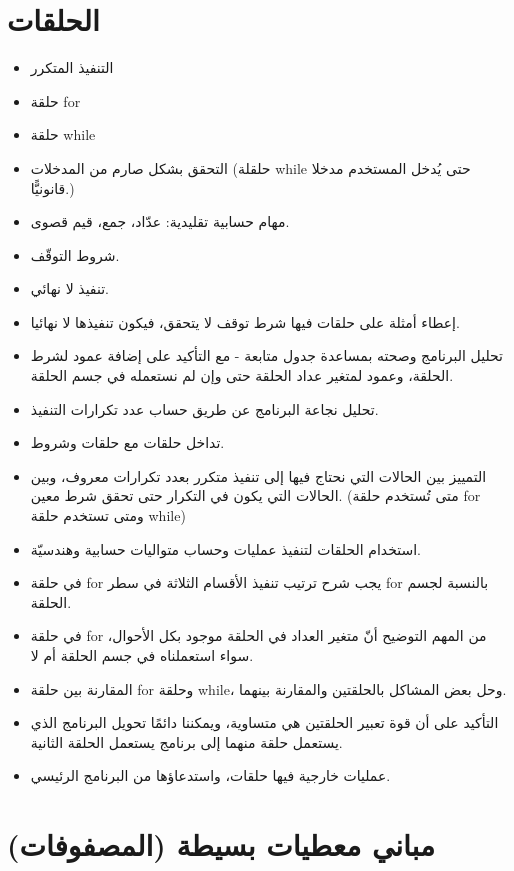 ﻿\documentclass[14pt]{extarticle}
\begin{document}
\section{الحلقات}
\begin{itemize}
    \item التنفيذ المتكرر
    \item حلقة \textenglish{for}
    \item حلقة \textenglish{while}
    \item التحقق بشكل صارم من المدخلات (حلقلة \textenglish{while} حتى يُدخل المستخدم مدخلا قانونيًّا.)
    \item مهام حسابية تقليدية: عدّاد، جمع، قيم قصوى.
    \item شروط التوقّف.
    \item تنفيذ لا نهائي.
    \item إعطاء أمثلة على حلقات فيها شرط توقف لا يتحقق، فيكون تنفيذها لا نهائيا.
    \item تحليل البرنامج وصحته بمساعدة جدول متابعة - مع التأكيد على إضافة عمود لشرط الحلقة، وعمود لمتغير عداد الحلقة حتى وإن لم نستعمله في جسم الحلقة.
    \item تحليل نجاعة البرنامج عن طريق حساب عدد تكرارات التنفيذ.
    \item تداخل حلقات مع حلقات وشروط.
    \item التمييز بين الحالات التي نحتاج فيها إلى تنفيذ متكرر بعدد تكرارات معروف، وبين الحالات التي يكون في التكرار حتى
    تحقق شرط معين. (متى تُستخدم حلقة \textenglish{for} ومتى تستخدم حلقة \textenglish{while})
    \item استخدام الحلقات لتنفيذ عمليات وحساب متواليات حسابية وهندسيّة.
    \item في حلقة \textenglish{for} يجب شرح ترتيب تنفيذ الأقسام الثلاثة في سطر \textenglish{for} بالنسبة لجسم الحلقة.
    \item في حلقة \textenglish{for} من المهم التوضيح أنّ متغير العداد في الحلقة موجود بكل الأحوال، سواء استعملناه في جسم الحلقة أم لا.
    \item المقارنة بين حلقة \textenglish{for} وحلقة \textenglish{while}، وحل بعض المشاكل بالحلقتين والمقارنة بينهما.
    \item التأكيد على أن قوة تعبير الحلقتين هي متساوية، ويمكننا دائمًا تحويل البرنامج الذي يستعمل حلقة منهما إلى برنامج يستعمل الحلقة الثانية.
    \item عمليات خارجية فيها حلقات، واستدعاؤها من البرنامج الرئيسي.
\end{itemize}


\clearpage
\section{مباني معطيات بسيطة (المصفوفات)}
\end{document}
